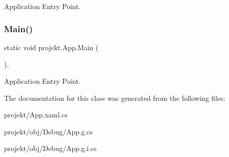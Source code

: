 Application Entry Point. 

\mbox{\label{classprojekt_1_1_app_aa099f0b6d877e4097ec4cbc0f99826ae}} 
\subsubsection{\texorpdfstring{Main()}{Main()}\hspace{0.1cm}{\footnotesize\ttfamily [9/9]}}
{\footnotesize\ttfamily static void projekt.\+App.\+Main (\begin{DoxyParamCaption}{ }\end{DoxyParamCaption})\hspace{0.3cm}{\ttfamily [inline]}, {\ttfamily [static]}}



Application Entry Point. 



The documentation for this class was generated from the following files\+:\begin{DoxyCompactItemize}
\item 
projekt/App.\+xaml.\+cs\item 
projekt/obj/\+Debug/App.\+g.\+cs\item 
projekt/obj/\+Debug/App.\+g.\+i.\+cs\end{DoxyCompactItemize}
